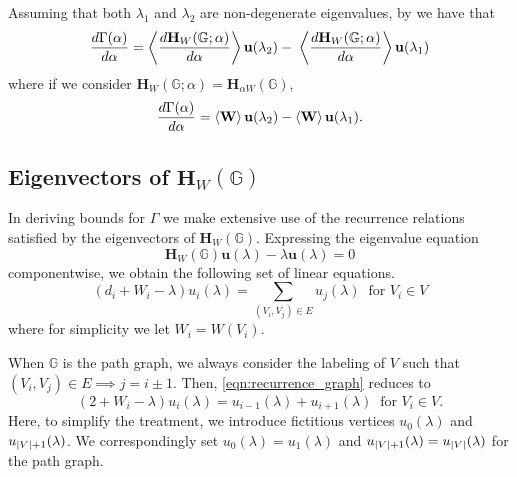  Assuming that both $\lambda_1$ and $\lambda_2$ are non-degenerate eigenvalues, by  we have that
    \begin{equation}\label{eqn:Hellman-Feynman}
      \frac{d \Gamma(\alpha)}{d \alpha} = \left \langle \frac{d \mathbf{H}_W(\mathbb{G};\alpha)}{d \alpha} \right \rangle{\mathbf{u}(\lambda_2)} - \; \left \langle \frac{d \mathbf{H}_W(\mathbb{G};\alpha)}{d \alpha} \right \rangle{\mathbf{u}(\lambda_1)}
    \end{equation}
    where if we consider $\mathbf{H}_W(\mathbb{G};\alpha) = \mathbf{H}_{\alpha W}(\mathbb{G})$,
    \begin{equation}
      \frac{d \Gamma(\alpha)}{d \alpha} = \left \langle \mathbf{W} \right \rangle{\mathbf{u}(\lambda_2)} - \left \langle \mathbf{W} \right \rangle{\mathbf{u}(\lambda_1)}.
    \end{equation}

  \subsection{Eigenvectors of $\mathbf{H}_W(\mathbb{G})$}
    In deriving bounds for $\Gamma$ we make extensive use of the recurrence relations satisfied by the eigenvectors of $\mathbf{H}_W(\mathbb{G})$. Expressing the eigenvalue equation
    \begin{equation}
      \mathbf{H}_W(\mathbb{G}) \mathbf{u}(\lambda) - \lambda \mathbf{u}(\lambda)=0
    \end{equation}
    componentwise, we obtain the following set of linear equations.
    \begin{equation}\label{eqn:recurrence_graph}
      (d_i + W_i - \lambda)u_i(\lambda) = \sum_{(V_i,V_j)\in E} u_j(\lambda) \;\; \text{for $V_i \in V$}
    \end{equation}
    where for simplicity we let $W_i = W(V_i)$.

    When $\mathbb{G}$ is the path graph, we always consider the labeling of $V$ such that $(V_i,V_j) \in E \implies j = i\pm1$. Then, \cref{eqn:recurrence_graph} reduces to
    \begin{equation}\label{eqn:recurrence}
      (2 + W_i - \lambda)u_i(\lambda) = u_{i-1}(\lambda) + u_{i+1}(\lambda) \;\; \text{for $V_i \in V$.}
    \end{equation}
    Here, to simplify the treatment, we introduce fictitious vertices $u_0(\lambda)$ and $u_{\left\lvert V \right\rvert+1}(\lambda)$. We correspondingly set $u_0(\lambda)=u_1(\lambda)$ and $u_{\left\lvert V \right\rvert+1}(\lambda)=u_{\left\lvert V \right\rvert}(\lambda)$ for the path graph.

